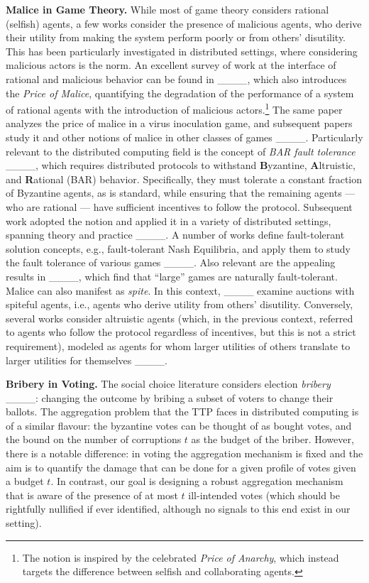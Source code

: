 \noindent\textbf{Malice in Game Theory.} While most of game theory considers rational (selfish) agents, a few works consider the presence of malicious agents, who derive their utility from making the system perform poorly or from others' disutility. This has been particularly investigated in distributed settings, where considering malicious actors is the norm. An excellent survey of work at the interface of rational and malicious behavior can be found in ____, which also introduces the \emph{Price of Malice}, quantifying the degradation of the performance of a system of rational agents with the introduction of malicious actors.\footnote{The notion is inspired by the celebrated \emph{Price of Anarchy}, which instead targets the difference between selfish and collaborating agents.} The same paper analyzes the price of malice in a virus inoculation game, and subsequent papers study it and other notions of malice in other classes of games ____. Particularly relevant to the distributed computing field is the concept of \emph{BAR fault tolerance} ____, which requires distributed protocols to withstand \textbf{B}yzantine, \textbf{A}ltruistic, and \textbf{R}ational (BAR) behavior. Specifically, they must tolerate a constant fraction of Byzantine agents, as is standard, while ensuring that the remaining agents --- who are rational --- have sufficient incentives to follow the protocol. Subsequent work adopted the notion and applied it in a variety of distributed settings, spanning theory and practice ____. A number of works define fault-tolerant solution concepts, e.g., fault-tolerant Nash Equilibria, and apply them to study the fault tolerance of various games ____. Also relevant are the appealing results in ____, which find that ``large'' games are naturally fault-tolerant. Malice can also manifest as \emph{spite}. In this context, ____ examine auctions with spiteful agents, i.e., agents who derive utility from others' disutility. Conversely, several works consider altruistic agents (which, in the previous context, referred to agents who follow the protocol regardless of incentives, but this is not a strict requirement), modeled as agents for whom larger utilities of others translate to larger utilities for themselves ____.

\noindent \textbf{Bribery in Voting.} The social choice literature considers election \emph{bribery} ____: changing the outcome 
by bribing a subset of voters to change their ballots. The aggregation problem that the TTP faces in distributed computing is of a similar flavour: the byzantine votes can be thought of as bought votes, and the bound on the number of corruptions $t$ as the budget of the briber. However, there is a notable difference: in voting the aggregation mechanism is fixed and the aim is to quantify the damage that can be done for a given profile of votes given a budget $t$. In contrast, our goal is designing a robust aggregation mechanism that is aware of the presence of at most $t$ ill-intended votes (which should be rightfully nullified if ever identified, although no signals to this end exist in our setting).

